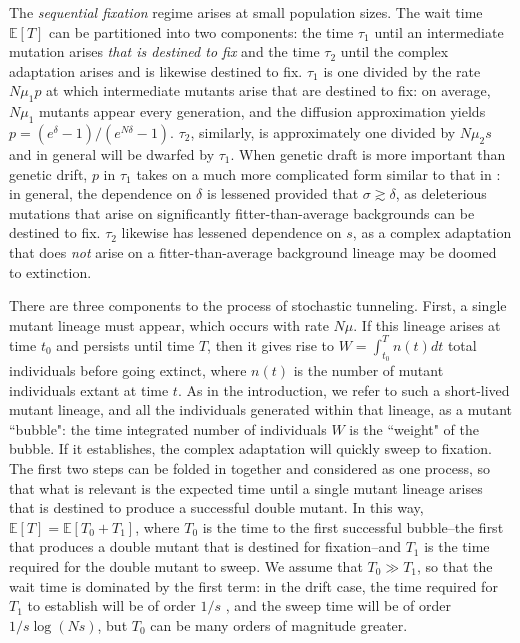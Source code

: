 \documentclass[10pt,twocolumn,twoside]{gsajnl}
\begin{document}
\begin{spacing}{1.5}
The \emph{sequential fixation} regime arises at small population sizes.
The wait time $\mathbb{E}\left[ T\right]$ can be partitioned into two components: the time $\tau_1$ until an intermediate mutation arises \emph{that is destined to fix} and the time $\tau_2$ until the complex adaptation arises and is likewise destined to fix.
$\tau_1$ is one divided by the rate $N\mu_1 p$ at which intermediate mutants arise that are destined to fix: on average, $N\mu_1$ mutants appear every generation, and the diffusion approximation yields $p = (e^\delta - 1)/(e^{N\delta} - 1)$.
$\tau_2$, similarly, is approximately one divided by $N\mu_2 s$ and in general will be dwarfed by $\tau_1$.
When genetic draft is more important than genetic drift, $p$ in $\tau_1$ takes on a much more complicated form similar to that in \citet{good_desai_2014}: in general, the dependence on $\delta$ is lessened provided that $\sigma \gtrsim \delta$, as deleterious mutations that arise on significantly fitter-than-average backgrounds can be destined to fix.
$\tau_2$ likewise has lessened dependence on $s$, as a complex adaptation that does \emph{not} arise on a fitter-than-average background lineage may be doomed to extinction.


There are three components to the process of stochastic tunneling.
First, a single mutant lineage must appear, which occurs with rate $N\mu$.
If this lineage arises at time $t_0$ and persists until time $T$, then it gives rise to $W = \int_{t_0}^T n(t) dt$ total individuals before going extinct, where $n(t)$ is the number of mutant individuals extant at time $t$.
As in the introduction, we refer to such a short-lived mutant lineage, and all the individuals generated within that lineage, as a mutant ``bubble": the time integrated number of individuals $W$ is the ``weight" of the bubble.
If it establishes, the complex adaptation will quickly sweep to fixation.
The first two steps can be folded in together and considered as one process, so that what is relevant is the expected time until a single mutant lineage arises that is destined to produce a successful double mutant.
In this way, $\mathbb{E}\left[ T \right] = \mathbb{E} \left[ T_0 + T_1 \right]$, where $T_0$ is the time to the first successful bubble--the first that produces a double mutant that is destined for fixation--and $T_1$ is the time required for the double mutant to sweep.
We assume that $T_0 \gg T_1$, so that the wait time is dominated by the first term: in the drift case, the time required for $T_1$ to establish will be of order $1/s$ \citep{desai_fisher_2007}, and the sweep time will be of order $1/s \log (Ns)$, but $T_0$ can be many orders of magnitude greater.


\end{spacing}
\end{document}
